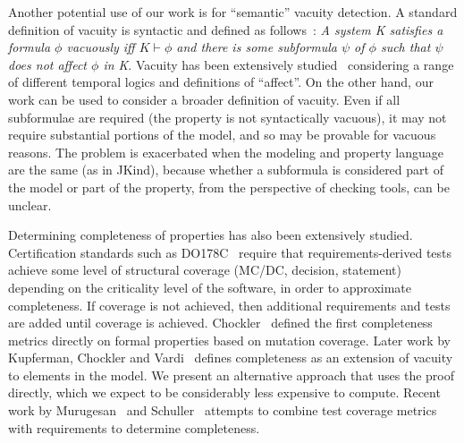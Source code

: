 Another potential use of our work is for ``semantic'' vacuity detection.  A standard definition of vacuity is syntactic and defined as follows~\cite{Kupferman:2006:SCF}: {\em A system K satisfies a formula $\phi$ vacuously iff $K \vdash \phi$ and there is some subformula $\psi$ of $\phi$ such that $\psi$ does not affect $\phi$ in K}.  Vacuity has been extensively studied~\cite{Gurfinkel:2012:RVB,Chockler2008,DBLP:Ben-DavidK13,Kupferman:2006:SCF,Chockler:2007,Beer1997} considering a range of different temporal logics and definitions of ``affect''.  On the other hand, our work can be used to consider a broader definition of vacuity.  Even if all subformulae are required (the property is not syntactically vacuous), it may not require substantial portions of the model, and so may be provable for vacuous reasons.  The problem is exacerbated when the modeling and property language are the same (as in JKind), because whether a subformula is considered part of the model or part of the property, from the perspective of checking tools, can be unclear.

Determining completeness of properties has also been extensively studied. Certification standards such as DO178C~\cite{DO178C} require that requirements-derived tests achieve some level of structural coverage (MC/DC, decision, statement) depending on the criticality level of the software, in order to approximate completeness.  If coverage is not achieved, then additional requirements and tests are added until coverage is achieved.  Chockler~\cite{Chockler2003} defined the first completeness metrics directly on formal properties based on mutation coverage.  Later work by Kupferman, Chockler and Vardi~\cite{Kupferman:2006:SCF} defines completeness as an extension of vacuity to elements in the model.  We present an alternative approach that uses the proof directly, which we expect to be considerably less expensive to compute.  Recent work by Murugesan~\cite{murugesan2015we} and Schuller~\cite{schuler_assessing_2011} attempts to combine test coverage metrics with requirements to determine completeness.




\iffalse
\begin{itemize}
    \item MUS's : checked
    \item Work on Alloy: checked
    \item Work that Teme pointed us to : will be added
    \item Anything else Elaheh has found : \%60 checked
\end{itemize}
\fi
